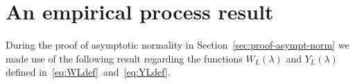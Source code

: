 \documentclass[journal]{IEEEtran}
\begin{document}

\section{An empirical process result}\label{sec:an-empirical-process}

During the proof of asymptotic normality in Section~\ref{sec:proof-asympt-norm} we made use of the following result regarding the functions $W_L(\lambda)$ and $Y_L(\lambda)$ defined in~\eqref{eq:WLdef}~and~\eqref{eq:YLdef}.
\end{document}
